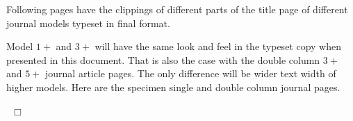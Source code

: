 \documentclass[a4paper,12pt]{article}
\begin{document}
Following pages have the clippings of different parts of
the title page of different journal models typeset in final
format.

Model $1+$ and $3+$  will have the same look and
feel in the typeset copy when presented in this document. That is
also the case with the double column $3+$ and $5+$ journal article
pages. The only difference will be wider text width of
higher models.  Here are the specimen single and double column journal 
pages.



\begin{comment}
\begin{center}
\hypertarget{bsc}{}
\hyperlink{sc}{
{\bf [Specimen single column article -- Click here]}
}


\hypertarget{bsc}{}
\hyperlink{dc}{
{\bf [Specimen double column article -- Click here]}
}
\end{center}
\end{comment}

\vspace*{-.5pc}

\enlargethispage*{\baselineskip}

\src{}\hypertarget{sc}{}
\def\rulecolor{blue!70}
\hyperlink{bsc}{}
\def\rulecolor{orange}

\src{}\hypertarget{dc}{}
\def\rulecolor{blue!70}
\hyperlink{bsc}{}
\def\rulecolor{orange}

~\hfill $\Box$
\end{document}

